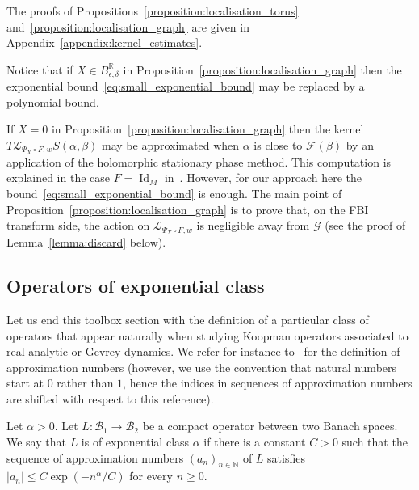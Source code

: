 \documentclass[AHL,Unicode,longabstracts,published]{cedram}
\DeclareMathOperator{\Id}{Id}
\newcommand{\p}[1]{\left(#1\right)}
\newcommand{\va}[1]{\left|#1\right|}
\newcommand{\clL}{\mathcal{L}}
\newcommand{\clF}{\mathcal{F}}
\newcommand{\clG}{\mathcal{G}}
\newcommand{\clB}{\mathcal{B}}
\newcommand{\bbN}{\mathbb{N}}
\newcommand{\bbR}{\mathbb{R}}
\begin{document}
The proofs of Propositions~\ref{proposition:localisation_torus} and~\ref{proposition:localisation_graph} are given in Appendix~\ref{appendix:kernel_estimates}.

\begin{rema}
Notice that if $X \in B_{\epsilon,\delta}^{\bbR}$ in Proposition~\ref{proposition:localisation_graph} then the exponential bound~\eqref{eq:small_exponential_bound} may be replaced by a polynomial bound.
\end{rema}

\begin{rema}
If $X = 0$ in Proposition~\ref{proposition:localisation_graph} then the kernel $T \clL_{\Psi_X \circ F,w} S(\alpha,\beta)$ may be approximated when $\alpha$ is close to $\clF(\beta)$ by an application of the holomorphic stationary phase method. This computation is explained in the case $F = \Id_M$ in~\cite[Lemma~2.10]{BJ20}. However, for our approach here the bound~\eqref{eq:small_exponential_bound} is enough. The main point of Proposition~\ref{proposition:localisation_graph} is to prove that, on the FBI transform side, the action on $\clL_{\Psi_X \circ F, w}$ is negligible away from $\clG$ (see the proof of Lemma~\ref{lemma:discard} below).
\end{rema}

\subsection{Operators of exponential class}\label{subsection:exponential_class}

Let us end this toolbox section with the definition of a particular class of operators that appear naturally when studying Koopman operators associated to real-analytic or Gevrey dynamics. We refer for instance to~\cite[\S~2.3.1]{pietsch_book} for the definition of approximation numbers (however, we use the convention that natural numbers start at $0$ rather than $1$, hence the indices in sequences of approximation numbers are shifted with respect to this reference).

\begin{defi}
Let $\alpha >0$. Let $L : \clB_1 \to \clB_2$ be a compact operator between two Banach spaces. We say that $L$ is of exponential class $\alpha$ if there is a constant $C > 0$ such that the sequence of approximation numbers $(a_n)_{n  \in \bbN}$ of $L$ satisfies $\va{a_n} \leq C \exp\p{ - n^\alpha /C}$ for every $n \geq 0$.
\end{defi}
\end{document}
